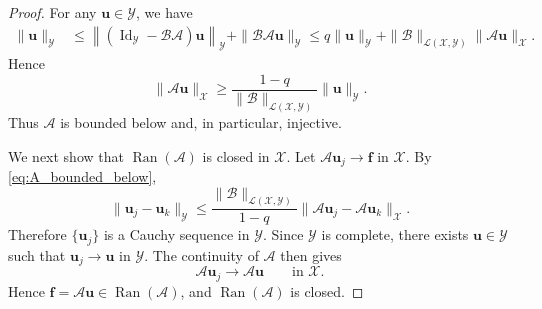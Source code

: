 \documentclass[preprint,numbers,sort&compress]{elsarticle}
\begin{document}
			\begin{proof}
				For any $\boldsymbol u\in\mathcal Y$, we have
				\[
				\begin{aligned}
					\|\boldsymbol u\|_{\mathcal Y}
					&\leq
					\left\|
					\left(
					\operatorname{Id}_{\mathcal Y}
					-
					\mathcal B\mathcal A
					\right)
					\boldsymbol u
					\right\|_{\mathcal Y}
					+
					\|\mathcal B\mathcal A\boldsymbol u\|_{\mathcal Y}\leq
					q\|\boldsymbol u\|_{\mathcal Y}
					+
					\|\mathcal B\|_{\mathcal L(\mathcal X,\mathcal Y)}
					\|\mathcal A\boldsymbol u\|_{\mathcal X}.
				\end{aligned}
				\]
				Hence
				\begin{equation}
					\label{eq:A_bounded_below}
					\|\mathcal A\boldsymbol u\|_{\mathcal X}
					\geq
					\frac{1-q}
					{\|\mathcal B\|_{\mathcal L(\mathcal X,\mathcal Y)}}
					\|\boldsymbol u\|_{\mathcal Y}.
				\end{equation}
				Thus $\mathcal A$ is bounded below and, in particular, injective.
				
				We next show that $\operatorname{Ran}(\mathcal A)$ is closed in $\mathcal X$.
				Let
				$\mathcal A\boldsymbol u_j\to\boldsymbol f$ in $\mathcal X$.
				By \eqref{eq:A_bounded_below},
				\[
				\|\boldsymbol u_j-\boldsymbol u_k\|_{\mathcal Y}
				\leq
				\frac{\|\mathcal B\|_{\mathcal L(\mathcal X,\mathcal Y)}}{1-q}
				\|
				\mathcal A\boldsymbol u_j
				-
				\mathcal A\boldsymbol u_k
				\|_{\mathcal X}.
				\]
				Therefore $\{\boldsymbol u_j\}$ is a Cauchy sequence in $\mathcal Y$.
				Since $\mathcal Y$ is complete, there exists
				$\boldsymbol u\in\mathcal Y$ such that
				$\boldsymbol u_j\to\boldsymbol u$ in $\mathcal Y$.
				The continuity of $\mathcal A$ then gives
				\[
				\mathcal A\boldsymbol u_j
				\to
				\mathcal A\boldsymbol u
				\qquad\text{in }\mathcal X.
				\]
				Hence $\boldsymbol f=\mathcal A\boldsymbol u\in\operatorname{Ran}(\mathcal A)$,
				and $\operatorname{Ran}(\mathcal A)$ is closed.
				

\end{proof}
\end{document}

